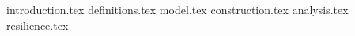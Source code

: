 {introduction.tex}
{definitions.tex}
{model.tex}
{construction.tex}
{analysis.tex}
{resilience.tex}

